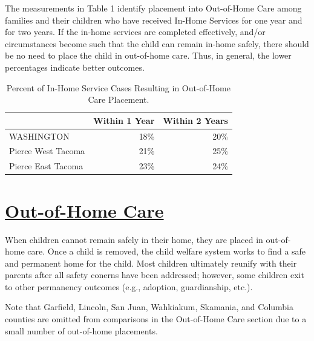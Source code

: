 \documentclass{article}\usepackage{graphicx, color}
\begin{document}
The measurements in Table 1 identify placement into Out-of-Home Care among families and their children who have received In-Home Services for one year and for two years. If the in-home services are completed effectively, and/or circumstances become such that the child can remain in-home safely, there should be no need to place the child in out-of-home care. Thus, in general, the lower percentages indicate better outcomes.

\begin{table}[ht]
\centering
\caption{Percent of In-Home Service Cases Resulting in Out-of-Home Care Placement.} 
\begin{tabular}{lrr}
  \toprule
 & Within 1 Year & Within 2 Years \\ 
  \midrule
WASHINGTON & 18\% & 20\% \\ 
  Pierce West Tacoma & 21\% & 25\% \\ 
  Pierce East Tacoma & 23\% & 24\% \\ 
   \bottomrule
\end{tabular}
\end{table}



\section{\href{http://www.partnersforourchildren.org/child-well-being/visualizations/out-home-care/trends}
    {Out-of-Home Care}
}
When children cannot remain safely in their home, they are placed in out-of-home care. Once a child is removed, the child welfare system works to find a safe and permanent home for the child. Most children ultimately reunify with their parents after all safety conerns have been addressed; however, some children exit to other permanency outcomes (e.g., adoption, guardianship, etc.).

Note that Garfield, Lincoln, San Juan, Wahkiakum, Skamania, and Columbia counties are omitted from comparisons in the Out-of-Home Care section due to a small number of out-of-home placements.
\end{document}
